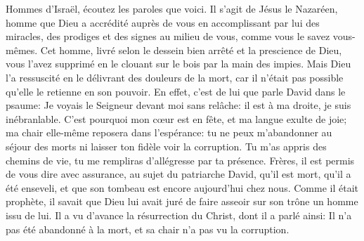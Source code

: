 Hommes d’Israël, écoutez les paroles que voici.
	Il s’agit de Jésus le Nazaréen, homme que Dieu a accrédité auprès de vous
	en accomplissant par lui des miracles,
	des prodiges et des signes au milieu de vous,
	comme vous le savez vous-mêmes.
Cet homme, livré selon le dessein bien arrêté et la prescience de Dieu,
	vous l’avez supprimé en le clouant sur le bois par la main des impies.
Mais Dieu l’a ressuscité en le délivrant des douleurs de la mort,
	car il n’était pas possible qu’elle le retienne en son pouvoir.
En effet, c’est de lui que parle David dans le psaume:
	Je voyais le Seigneur devant moi sans relâche:
	il est à ma droite, je suis inébranlable.
	C’est pourquoi mon cœur est en fête, et ma langue exulte de joie;
	ma chair elle-même reposera dans l’espérance:
	tu ne peux m’abandonner au séjour des morts
	ni laisser ton fidèle voir la corruption.
	Tu m’as appris des chemins de vie,
	tu me rempliras d’allégresse par ta présence.
Frères, il est permis de vous dire avec assurance,
	au sujet du patriarche David,
	qu’il est mort, qu’il a été enseveli,
	et que son tombeau est encore aujourd’hui chez nous.
Comme il était prophète, il savait que Dieu lui avait juré
	de faire asseoir sur son trône un homme issu de lui.
Il a vu d’avance la résurrection du Christ, dont il a parlé ainsi:
	Il n’a pas été abandonné à la mort,
	et sa chair n’a pas vu la corruption.
